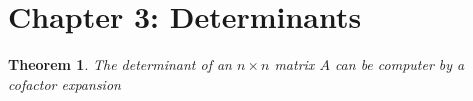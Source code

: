 \documentclass[11pt,answers]{exam} %
\newtheorem{theorem}{Theorem}
\begin{document}
\flushleft

\section{Chapter 3: Determinants}
\begin{theorem}
The determinant of an $n \times n$ matrix $A$ can be computer by a cofactor expansion
\end{theorem}
\end{document}
